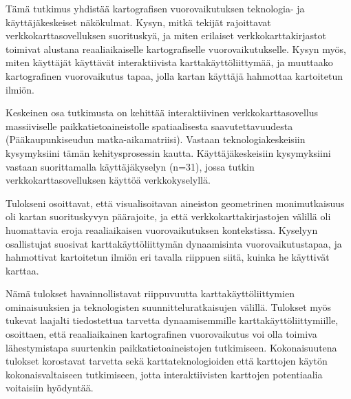 \begin{spacing}{1}
Tämä tutkimus yhdistää kartografisen vuorovaikutuksen teknologia- ja käyttäjäkeskeiset näkökulmat.
Kysyn, mitkä tekijät rajoittavat verkkokarttasovelluksen suorituskyä,
ja miten erilaiset verkkokarttakirjastot toimivat alustana reaaliaikaiselle kartografiselle vuorovaikutukselle.
Kysyn myös, miten käyttäjät käyttävät interaktiivista karttakäyttöliittymää,
ja muuttaako kartografinen vuorovaikutus tapaa, jolla kartan käyttäjä hahmottaa kartoitetun ilmiön.

Keskeinen osa tutkimusta on kehittää interaktiivinen verkkokarttasovellus
massiiviselle paikkatietoaineistolle spatiaalisesta saavutettavuudesta (Pääkaupunkiseudun matka-aikamatriisi).
Vastaan teknologiakeskeisiin kysymyksiini tämän kehitysprosessin kautta.
Käyttäjäkeskeisiin kysymyksiini vastaan suorittamalla käyttäjäkyselyn (n=31),
jossa tutkin verkkokarttasovelluksen käyttöä verkkokyselyllä.

Tulokseni osoittavat, että visualisoitavan aineiston geometrinen monimutkaisuus
oli kartan suorituskyvyn päärajoite, ja että verkkokarttakirjastojen välillä oli
huomattavia eroja reaaliaikaisen vuorovaikutuksen kontekstissa.
Kyselyyn osallistujat suosivat karttakäyttöliittymän dynaamisinta vuorovaikutustapaa,
ja hahmottivat kartoitetun ilmiön eri tavalla riippuen siitä, kuinka he käyttivät karttaa.

Nämä tulokset havainnollistavat riippuvuutta karttakäyttöliittymien ominaisuuksien
ja teknologisten suunnitteluratkaisujen välillä.
Tulokset myös tukevat laajalti tiedostettua tarvetta dynaamisemmille karttakäyttöliittymiille,
osoittaen, että reaaliaikainen kartografinen vuorovaikutus voi olla toimiva lähestymistapa suurtenkin
paikkatietoaineistojen tutkimiseen.
Kokonaisuutena tulokset korostavat tarvetta
sekä karttateknologioiden että karttojen käytön kokonaisvaltaiseen tutkimiseen,
jotta interaktiivisten karttojen potentiaalia voitaisiin hyödyntää.

\end{spacing}
